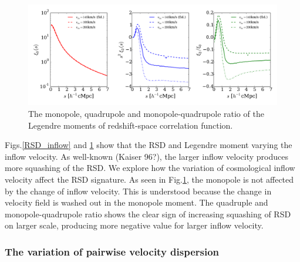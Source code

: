 \documentclass[useAMS,usenatbib,twocolumn]{mn2e}
\begin{document}
\begin{figure}
 \begin{center}
  \includegraphics[angle=0,width=\textwidth]{figure/RSD_moment_model1-4-5.pdf}
  \caption{The monopole, quadrupole and monopole-quadrupole ratio of the Legendre
    moments of redshift-space correlation function.}\label{moment_inflow}
 \end{center}
\end{figure}

Figs.\ref{RSD_inflow} and \ref{moment_inflow} show that the RSD and Legendre
moment varying the inflow velocity. As well-known (Kaiser 96?), the larger 
inflow velocity produces more squashing of the RSD. We explore how the
variation of cosmological inflow velocity affect the RSD signature.
As seen in Fig.\ref{moment_inflow}, the monopole is not affected by
the change of inflow velocity. This is understood because the change in
velocity field is washed out in the monopole moment. The quadruple and
monopole-quadrupole ratio shows the clear sign of increasing squashing of
RSD on larger scale, producing more negative value for larger inflow
velocity.


\subsubsection{The variation of pairwise velocity dispersion}
\end{document}
